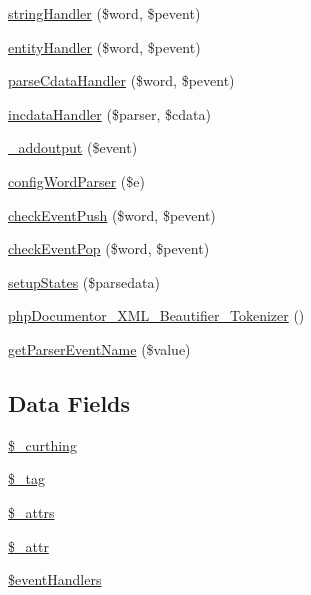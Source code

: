 \begin{DoxyCompactItemize}
\item 
\hyperlink{classphp_documentor___x_m_l___beautifier___tokenizer_a7074a025fb67fabb64838b6ab42473ee}{string\-Handler} (\$word, \$pevent)
\item 
\hyperlink{classphp_documentor___x_m_l___beautifier___tokenizer_a13d9333a7165c6408019b2c9f8830ef0}{entity\-Handler} (\$word, \$pevent)
\item 
\hyperlink{classphp_documentor___x_m_l___beautifier___tokenizer_a212920f9bd5da14bc9fa4f761b0344aa}{parse\-Cdata\-Handler} (\$word, \$pevent)
\item 
\hyperlink{classphp_documentor___x_m_l___beautifier___tokenizer_a99b5f06ff696bf81c5060660ad645bb9}{incdata\-Handler} (\$parser, \$cdata)
\item 
\hyperlink{classphp_documentor___x_m_l___beautifier___tokenizer_ac7a074af52f39850d4757774cfedb0b1}{\-\_\-addoutput} (\$event)
\item 
\hyperlink{classphp_documentor___x_m_l___beautifier___tokenizer_a283368f67f931488905c6f3f84b1c549}{config\-Word\-Parser} (\$e)
\item 
\hyperlink{classphp_documentor___x_m_l___beautifier___tokenizer_a912ba83822697d200d7e2771166f6718}{check\-Event\-Push} (\$word, \$pevent)
\item 
\hyperlink{classphp_documentor___x_m_l___beautifier___tokenizer_a9f5347fcba49d2192e689e417671ce18}{check\-Event\-Pop} (\$word, \$pevent)
\item 
\hyperlink{classphp_documentor___x_m_l___beautifier___tokenizer_aa78ac0cfd4a15cb88503eb96babffa87}{setup\-States} (\$parsedata)
\item 
\hyperlink{classphp_documentor___x_m_l___beautifier___tokenizer_a4d271e14d997e2d3d96ddd24b920cafc}{php\-Documentor\-\_\-\-X\-M\-L\-\_\-\-Beautifier\-\_\-\-Tokenizer} ()
\item 
\hyperlink{classphp_documentor___x_m_l___beautifier___tokenizer_a9cc8a14f4bce21f0058f33036a2eb460}{get\-Parser\-Event\-Name} (\$value)
\end{DoxyCompactItemize}
\subsection*{\-Data \-Fields}
\begin{DoxyCompactItemize}
\item 
\hyperlink{classphp_documentor___x_m_l___beautifier___tokenizer_a2d2963f96f6b64bf9929de0d5fa5be81}{\$\-\_\-curthing}
\item 
\hyperlink{classphp_documentor___x_m_l___beautifier___tokenizer_aa0fa1fc72b8693f59aa85c52c3211730}{\$\-\_\-tag}
\item 
\hyperlink{classphp_documentor___x_m_l___beautifier___tokenizer_a60ddc32384813e2973c74a4c17c8f3e9}{\$\-\_\-attrs}
\item 
\hyperlink{classphp_documentor___x_m_l___beautifier___tokenizer_ab1bd40c1128ec90e55ab793b2d4a5f3e}{\$\-\_\-attr}
\item 
\hyperlink{classphp_documentor___x_m_l___beautifier___tokenizer_a430675102684e9ab820c7622678832b0}{\$event\-Handlers}
\end{DoxyCompactItemize}


